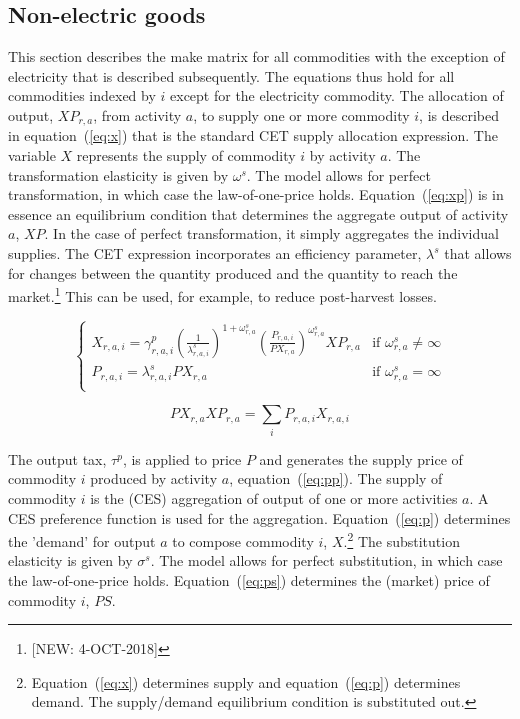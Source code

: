 \documentclass[11pt,letterpaper]{report}
\begin{document}
\subsection{Non-electric goods}

This section describes the make matrix for all commodities with the exception of
electricity that is described subsequently. The equations thus hold for all
commodities indexed by $i$ except for the electricity commodity. The allocation
of output, $\mathit{XP_{r,a}}$, from activity $a$, to supply one or more
commodity $i$, is described in equation~(\ref{eq:x}) that is the standard CET
supply allocation expression. The variable $X$ represents the supply of
commodity $i$ by activity $a$. The transformation elasticity is given by
$\omega^{\mathit{s}}$. The model allows for perfect transformation, in which
case the law-of-one-price holds. Equation~(\ref{eq:xp}) is in essence an
equilibrium condition that determines the aggregate output of activity $a$,
$\mathit{XP}$. In the case of perfect transformation, it simply aggregates the
individual supplies. The CET expression incorporates an efficiency parameter,
$\lambda^s$ that allows for changes between the quantity produced and the
quantity to reach the market.\footnote{[NEW: 4-OCT-2018]} This can be used, for example, to reduce
post-harvest losses.

\begin{equation}
\label{eq:x}
\begin{cases}
   \mathit{X}_{r,a,i} =
      \displaystyle
         \gamma^{\mathit{p}}_{r,a,i}
         \left(\frac{1}{\lambda^s_{r,a,i}}\right)^{1+\omega^s_{r,a}}
         \left( \frac {\mathit{P}_{r,a,i}} {\mathit{PX}_{r,a}}
         \right)^{\omega^{\mathit{s}}_{r,a}}
         \mathit{XP}_{r,a}
      & \textrm{if } \omega^{\mathit{s}}_{r,a} \ne \infty \\
      \mathit{P}_{r,a,i} = \lambda^s_{r,a,i} \mathit{PX}_{r,a}
      & \textrm{if } \omega^{\mathit{s}}_{r,a} = \infty \\
\end{cases}
\end{equation}

\begin{equation}
\label{eq:xp}
\mathit{PX}_{r,a} \mathit{XP}_{r,a} =
   \sum_i{
      \mathit{P}_{r,a,i} \mathit{X}_{r,a,i}
   }
\end{equation}

The output tax, $\tau^p$, is applied to price $P$ and generates the supply price
of commodity $i$ produced by activity $a$, equation~(\ref{eq:pp}). The supply of
commodity $i$ is the (CES) aggregation of output of one or more activities $a$.
A CES preference function is used for the aggregation. Equation~(\ref{eq:p})
determines the 'demand' for output $a$ to compose commodity $i$,
$X$.\footnote{Equation~(\ref{eq:x}) determines supply and equation~(\ref{eq:p})
determines demand. The supply/demand equilibrium condition is substituted out.}
The substitution elasticity is given by $\sigma^{\mathit{s}}$. The model allows
for perfect substitution, in which case the law-of-one-price holds.
Equation~(\ref{eq:ps}) determines the (market) price of commodity $i$,
$\mathit{PS}$.
\end{document}

